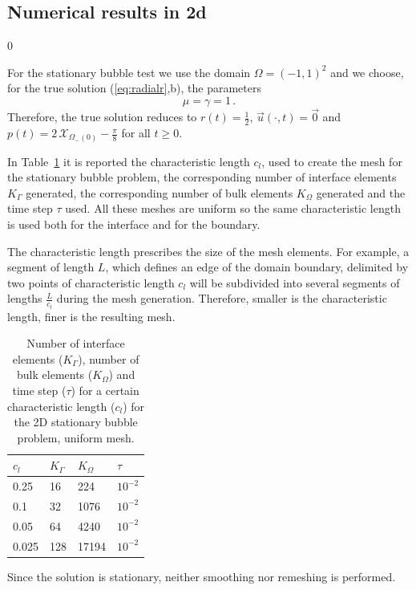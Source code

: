 \documentclass[a4paper,12pt,onecolumn]{article}
\newcommand{\bigchi}{\ensuremath{\mathrm{\mathcal{X}}}}
\newcommand{\charfcn}[1]{\bigchi_{#1}} %
\begin{document}
\subsection{Numerical results in 2d} \label{subsec:numerical_results_2d}
\setcounter{equation} 0

For the stationary bubble test we use the domain $\Omega = (-1,1)^2$ and we choose, for the true solution (\ref{eq:radialr},b), the parameters
\begin{equation*}
\mu = \gamma = 1\,. 
\end{equation*}
Therefore, the true solution reduces to $r(t) = \frac{1}{2}$, $\vec u(\cdot, t) = \vec 0$ and $p(t) = 2\,\charfcn{\Omega_-(0)} - \frac{\pi}{8}$ for all $t \geq 0$.

In Table~\ref{tab:bubble2Delementsuniform} it is reported the characteristic length $c_l$, used to create the mesh for the stationary bubble problem, the corresponding number of interface elements $K_\Gamma$ generated, the corresponding number of bulk elements $K_\Omega$ generated and the time step $\tau$ used. All these meshes are uniform so the same characteristic length is used both for the interface and for the boundary. 

The characteristic length prescribes the size of the mesh elements. For example, a segment of length $L$, which defines an edge of the domain boundary, delimited by two points of characteristic length $c_l$ will be subdivided into several segments of lengths $\frac{L}{c_l}$ during the mesh generation. Therefore, smaller is the characteristic length, finer is the resulting mesh.   
\begin{table}
 \center
\begin{tabular}{llll}
\hline
$c_l$ & $K_\Gamma$ & $K_\Omega$ & $\tau$ \\
\hline
0.25 & 16 & 224 & $10^{-2}$ \\
0.1 & 32 & 1076 & $10^{-2}$\\
0.05 & 64 & 4240 & $10^{-2}$\\
0.025 & 128 & 17194 & $10^{-2}$ \\
\hline
\end{tabular}
\caption{Number of interface elements ($K_\Gamma$), number of bulk elements ($K_\Omega$) and time step ($\tau$) for a certain characteristic length ($c_l$) for the 2D stationary bubble problem, uniform mesh.}
\label{tab:bubble2Delementsuniform}
\end{table}

Since the solution is stationary, neither smoothing nor remeshing is performed. 
\end{document}
